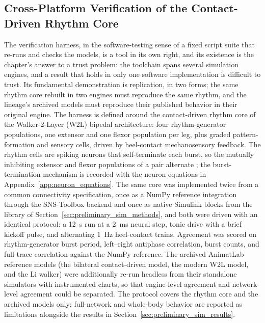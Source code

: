 \subsection{Cross-Platform Verification of the Contact-Driven Rhythm Core}\label{sec:crossengine_methods}

The verification harness, in the software-testing sense of a fixed script suite that re-runs and checks the models, is a tool in its own right, and its existence is the chapter's answer to a trust problem: the toolchain spans several simulation engines, and a result that holds in only one software implementation is difficult to trust. Its fundamental demonstration is replication, in two forms; the same rhythm core rebuilt in two engines must reproduce the same rhythm, and the lineage's archived models must reproduce their published behavior in their original engine. The harness is defined around the contact-driven rhythm core of the Walker-2-Layer (W2L) bipedal architecture: four rhythm-generator populations, one extensor and one flexor population per leg, plus graded pattern-formation and sensory cells, driven by heel-contact mechanosensory feedback. The rhythm cells are spiking neurons that self-terminate each burst, so the mutually inhibiting extensor and flexor populations of a pair alternate \citep{deng_neuromechanical_2019}; the burst-termination mechanism is recorded with the neuron equations in Appendix~\ref{app:neuron_equations}. The same core was implemented twice from a common connectivity specification, once as a NumPy reference integration through the SNS-Toolbox backend and once as native Simulink blocks from the library of Section~\ref{sec:preliminary_sim_methods}, and both were driven with an identical protocol: a \qty{12}{\second} run at a \qty{2}{\milli\second} neural step, tonic drive with a brief kickoff pulse, and alternating \qty{1}{\Hz} heel-contact trains. Agreement was scored on rhythm-generator burst period, left--right antiphase correlation, burst counts, and full-trace correlation against the NumPy reference. The archived AnimatLab reference models (the bilateral contact-driven model, the modern W2L model, and the Li walker) were additionally re-run headless from their standalone simulators with instrumented charts, so that engine-level agreement and network-level agreement could be separated. The protocol covers the rhythm core and the archived models only; full-network and whole-body behavior are reported as limitations alongside the results in Section~\ref{sec:preliminary_sim_results}.


